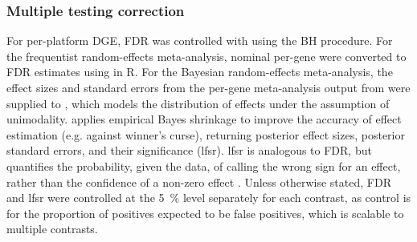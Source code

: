 \subsubsection{Multiple testing correction}
\label{subsubsec:hird_dge_multipleTestingCorrection}

%
For per-platform \gls{DGE}, \gls{FDR} was controlled with  using the \gls{BH} procedure.
For the frequentist random-effects meta-analysis, nominal per-gene \pvalues{} were converted to \gls{FDR} estimates using  in R.
%
For the Bayesian random-effects meta-analysis, 
the effect sizes and standard errors from the per-gene meta-analysis output from  were supplied to  \autocite{stephens2016FalseDiscoveryRates},
which models the distribution of effects under the assumption of unimodality.
 applies empirical Bayes shrinkage to improve the accuracy of effect estimation (e.g. against winner's curse),
returning posterior effect sizes, posterior standard errors, and their significance (\gls{lfsr}).
\gls{lfsr} is analogous to \gls{FDR}, but quantifies the probability, given the data, of calling the wrong sign for an effect,
rather than the confidence of a non-zero effect \autocite{stephens2016FalseDiscoveryRates}.
Unless otherwise stated, \gls{FDR} and \gls{lfsr} were controlled at the \SI{5}{\percent} level separately for each contrast,
as control is for the proportion of positives expected to be false positives,
which is scalable to multiple contrasts.

